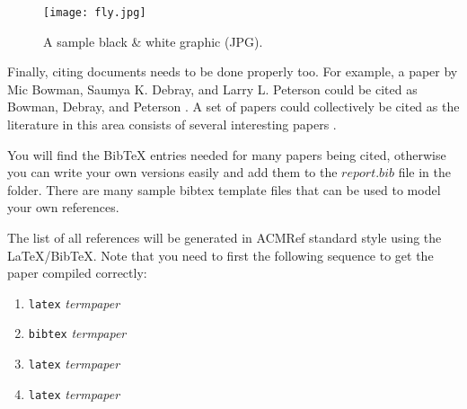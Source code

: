 \documentclass{sig-alternate}
\begin{document}
\begin{figure}[htb]
\label{sample graphic}
\begin{center}
\texttt{[image: fly.jpg]}
\caption{A sample black \& white graphic (JPG).}
\end{center}
\end{figure}

Finally, citing documents needs to be done properly too. For
example, a paper by Mic Bowman, Saumya K. Debray, and Larry
L. Peterson could be cited as Bowman, Debray, and Peterson
\cite{bowman:reasoning}. A set of papers could collectively
be cited as the literature in this area consists of several
interesting papers
\cite{braams:babel,clark:pct,herlihy:methodology}.

You will find the BibTeX entries needed for many papers being cited,
otherwise you can write your own versions easily and add them to the
$report.bib$ file in the folder. There are many sample bibtex
template files that can be used to model your own references.

The list of all references will be generated in ACMRef
standard style using the \LaTeX{}/BibTeX. Note that you
need to first the following sequence to get the paper
compiled correctly:

\begin{enumerate}
\item {\tt latex} {\em termpaper}
\item {\tt bibtex} {\em termpaper}
\item {\tt latex} {\em termpaper}
\item {\tt latex} {\em termpaper}
\end{enumerate}



\balance
\end{document}
